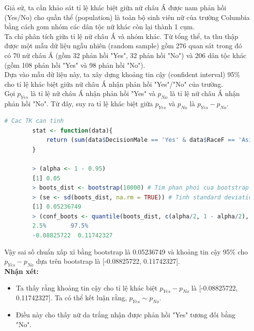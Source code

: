 \documentclass[a4paper,12pt]{article}
\begin{document}
			Giả sử, ta cần khảo sát tỉ lệ khác biệt giữa nữ châu Á được nam phản hồi (Yes/No) cho quần thể (population) là toàn bộ sinh viên nữ của trường Columbia bằng cách gom nhóm các dân tộc nữ khác còn lại thành 1 cụm.\\
			
			Ta chỉ phân tích giữa tỉ lệ nữ châu Á và nhóm khác. Từ tổng thể, ta thu thập được một mẫu dữ liệu ngẫu nhiên (random sample) gồm 276 quan sát trong đó có 70 nữ châu Á (gồm 32 phản hồi "Yes", 32 phản hồi "No") và 206 dân tộc khác (gồm 108 phản hồi "Yes" và 98 phản hồi "No").\\
			
			Dựa vào mẫu dữ liệu này, ta xây dựng khoảng tin cậy (confident interval) 95\% cho tỉ lệ khác biệt giữa nữ châu Á nhận phản hồi "Yes"/"No" của trường.\\
		
		Gọi $p_{Yes}$ là tỉ lệ nữ châu Á nhận phản hồi "Yes" và $p_{No}$ là tỉ lệ nữ châu Á nhận phản hồi "No". Từ đây, suy ra tỉ lệ khác biệt giữa $p_{Yes}$ và $p_{No}$ là $p_{Yes} - p_{No}$.
		
		\begin{lstlisting}[language=R]
		# Cac TK can tinh
		stat <- function(data){
			return (sum(data$DecisionMale == 'Yes' & data$RaceF == 'Asian')/sum(data$DecisionMale == 'Yes') - sum(data$DecisionMale == 'No' & data$RaceF == 'Asian')/ sum(data$DecisionMale == 'No'))
		}
		
		> (alpha <- 1 - 0.95)
		[1] 0.05
		> boots_dist <- bootstrap(10000) # Tim phan phoi cua bootstrap
		> (se <- sd(boots_dist, na.rm = TRUE)) # Tinh standard deviation (missing value se bi bo qua)
		[1] 0.05236749
		> (conf_boots <- quantile(boots_dist, c(alpha/2, 1 - alpha/2), na.rm = TRUE)) # Tim khoang tin cay cho p
		2.5%       97.5% 
		-0.08825722  0.11742327
		\end{lstlisting}
		Vậy sai số chuẩn xấp xỉ bằng bootstrap là 0.05236749 và khoảng tin cậy 95\% cho $p_{Yes} - p_{No}$ dựa trên bootstrap là [-0.08825722, 0.11742327].\\
		
		\textbf{Nhận xét:}
		\begin{itemize}
			\item Ta thấy rằng khoảng tin cậy cho tỉ lệ khác biệt $p_{Yes} - p_{No}$ là [-0.08825722, 0.11742327]. Ta có thể kết luận rằng, $p_{Yes} \sim p_{No}$.
			\item Điều này cho thấy nữ da trắng nhận được phản hồi "Yes" tương đối bằng "No".
		\end{itemize}
\end{document}
